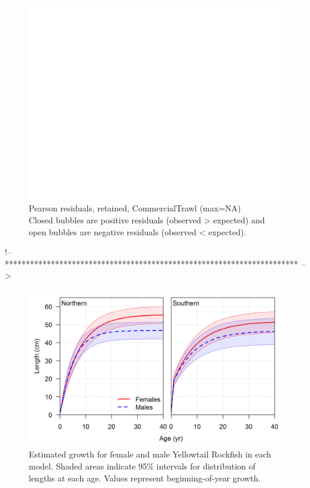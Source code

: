 \documentclass[12pt,]{article}
\begin{document}
\begin{figure}[htbp]
\centering
\includegraphics{./r4ss/plots_mod1/comp_gstlenfit_residsflt1mkt2.png}
\caption{Pearson residuals, retained, CommercialTrawl (max=NA)\\
Closed bubbles are positive residuals (observed \textgreater{} expected)
and open bubbles are negative residuals (observed \textless{} expected).
\label{fig:mod1_40_comp_gstlenfit_residsflt1mkt2}}
\end{figure}

\FloatBarrier

!--
**********************************************************************
--\textgreater{}

\begin{figure}[htbp]
\centering
\includegraphics{r4ss/plots_compare/growth_comparison.png}
\caption{Estimated growth for female and male Yellowtail Rockfish in
each model. Shaded areas indicate 95\% intervals for distribution of
lengths at each age. Values represent beginning-of-year growth.
\label{fig:growth}}
\end{figure}
\end{document}
